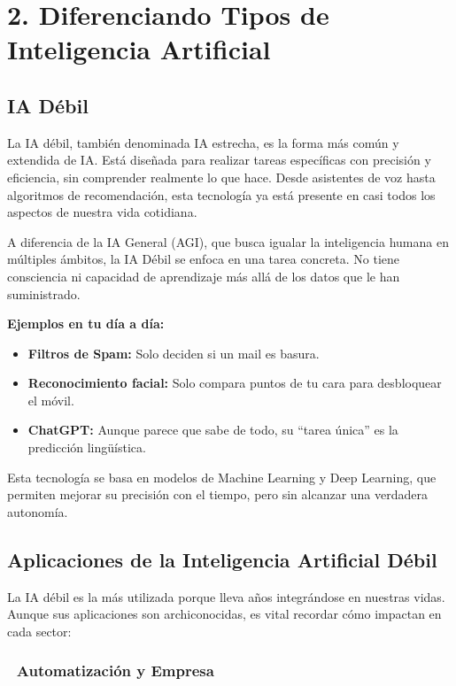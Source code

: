 \documentclass[
  spanish,
  letterpaper,
  DIV=11,
  numbers=noendperiod,
  oneside]{scrreprt}
\providecommand{\tightlist}{%
  \setlength{\itemsep}{0pt}\setlength{\parskip}{0pt}}
\begin{document}
\chapter{2. Diferenciando Tipos de Inteligencia
Artificial}\label{diferenciando-tipos-de-inteligencia-artificial}

\section{IA Débil}\label{ia-duxe9bil}

La IA débil, también denominada IA estrecha, es la forma más común y
extendida de IA. Está diseñada para realizar tareas específicas con
precisión y eficiencia, sin comprender realmente lo que hace. Desde
asistentes de voz hasta algoritmos de recomendación, esta tecnología ya
está presente en casi todos los aspectos de nuestra vida cotidiana.

A diferencia de la IA General (AGI), que busca igualar la inteligencia
humana en múltiples ámbitos, la IA Débil se enfoca en una tarea
concreta. No tiene consciencia ni capacidad de aprendizaje más allá de
los datos que le han suministrado.

\textbf{Ejemplos en tu día a día:}

\begin{itemize}
\tightlist
\item
  \textbf{Filtros de Spam:} Solo deciden si un mail es basura.
\item
  \textbf{Reconocimiento facial:} Solo compara puntos de tu cara para
  desbloquear el móvil.
\item
  \textbf{ChatGPT:} Aunque parece que sabe de todo, su ``tarea única''
  es la predicción lingüística.
\end{itemize}

Esta tecnología se basa en modelos de Machine Learning y Deep Learning,
que permiten mejorar su precisión con el tiempo, pero sin alcanzar una
verdadera autonomía.

\section{Aplicaciones de la Inteligencia Artificial
Débil}\label{aplicaciones-de-la-inteligencia-artificial-duxe9bil}

La IA débil es la más utilizada porque lleva años integrándose en
nuestras vidas. Aunque sus aplicaciones son archiconocidas, es vital
recordar cómo impactan en cada sector:

\subsection{🏢 Automatización y
Empresa}\label{automatizaciuxf3n-y-empresa}
\end{document}
